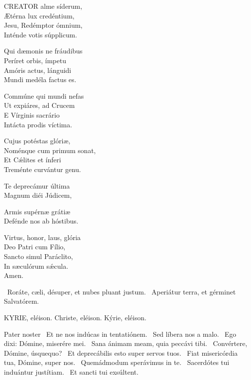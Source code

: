 
\lettrine[lines=2]{C}{REATOR} alme síderum,\\
Ætérna lux credéntium,\\
Jesu, Redémptor ómnium,\\
Inténde votis súpplicum.

Qui dæmonis ne fráudibus\\
Períret orbis, ímpetu\\
Amóris actus, lánguidi\\
Mundi medéla factus es.

Commúne qui mundi nefas\\
Ut expiáres, ad Crucem\\
E Vírginis sacrário\\
Intácta prodis víctima.

Cujus potéstas glóriæ,\\
Noménque cum primum sonat,\\
Et Cǽlites et ínferi\\
Treménte curvántur genu.

Te deprecámur última\\
Magnum diéi Júdicem,

Armis supérnæ grátiæ\\
Defénde nos ab hóstibus.

Virtus, honor, laus, glória\\
Deo Patri cum Fílio,\\
Sancto simul Paráclito,\\
In sæculórum sǽcula.\\
Amen.

\V\ Roráte, cæli, désuper, et nubes pluant justum. \R\ Aperiátur terra, et gérminet Salvatórem.




KYRIE, eléison. Christe, eléison. Kýrie, eléison.

Pater noster  \V\ Et ne nos indúcas in tentatiónem. \R\ Sed líbera nos a malo. \V\ Ego dixi: Dómine, miserére mei. \R\ Sana ánimam meam, quia peccávi tibi. \V\ Convértere, Dómine, úsquequo? \R\ Et deprecábilis esto super servos tuos. \V\ Fiat misericórdia tua, Dómine, super nos. \R\ Quemádmodum sperávimus in te. \V\ Sacerdótes tui induántur justítiam. \R\ Et sancti tui exsúltent.

